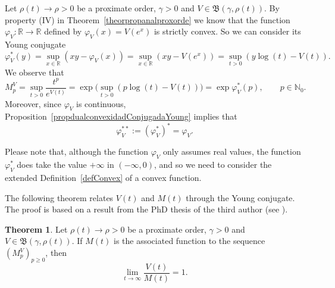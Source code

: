 \documentclass[11pt,a4paper]{article}
\theoremstyle{definition}
\newtheorem{theo}{Theorem}[section]
\def\fy{\varphi}
\def\oo{\infty}
\def\ri{\rightarrow}
\def\ga{\gamma}
\def\ro{\rho}
\def\Bet{\mathfrak{B}}
\def\N{\mathbb{N}}
\def\R{\mathbb{R}}
\begin{document}
Let $\ro(t) \ri \ro>0$ be a proximate order,  $\ga>0$ and $V \in \Bet(\ga, \ro(t) )$. By property (IV) in Theorem~\ref{theorpropanalproxorde}
we know that the function $\fy_V\colon \R \ri\R$ defined by $\fy_V(x)=V(e^x)$ is strictly convex. So we can consider its Young conjugate
$$\fy^*_V(y)=\sup_{x\in\R} (xy-\fy_V(x)) = \sup_{x\in\R} (xy-V(e^x))= \sup_{t>0}(y \log(t)-V(t)).$$
We observe that
\begin{equation}\label{equaMpVExpYoungConj}
M^V_p=\sup_{t>0} \frac{t^p}{e^{V(t)}} = \exp \big(\sup_{t> 0}( p \log(t)-V(t))\big) =\exp{\fy^*_V(p)}, \qquad p\in\N_0.
\end{equation}
Moreover, since $\fy_V$ is continuous, Proposition~\ref{propdualconvexidadConjugadaYoung} implies that
\begin{equation}\label{equaDoubleYoungConj}
\fy^{**}_V:=(\fy^*_V)^*=\fy_V.
\end{equation}

Please note that, although the function $\fy_V$ only assumes real values, the function $\fy^*_V$ does take the value $+\infty$ in $(-\infty,0)$, and so we need to consider the extended Definition~\ref{defConvex} of a convex function.

 The following theorem relates $V(t)$ and $M(t)$ through the Young conjugate. The proof is based on a result from
 the PhD thesis of the third author (see \cite[Theorem\ 4.0.3]{schindlthesis}).

 \begin{theo}\label{theo.VequivM}
  Let $\ro(t) \ri \ro>0$ be a proximate order,  $\ga>0$ and $V \in \Bet(\ga, \ro(t) )$. If $M(t)$ is the associated function to the sequence $(M^V_p)_{p\geq0}$,
  then
  $$\lim_{t\ri\oo} \frac{V(t)}{M(t)}=1.$$
\end{theo}
\end{document}
